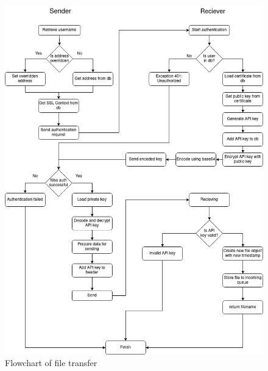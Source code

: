 \begin{figure}
    \centering
    \includegraphics[scale = 0.5]{images/file_send.png}
    \caption{Flowchart of file transfer}
    \label{fig:filetransfer}
\end{figure}